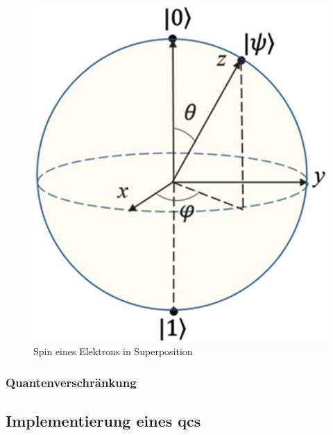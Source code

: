 \begin{figure}[!hbt]
    \centering
    \includegraphics{./images/spin-superpostition.jpg}
    \caption{Spin eines Elektrons in Superposition \cite{noauthor_cpb_27_9_090308_f8jpg_nodate}}
    \label{fig:spin}
\end{figure}

\subsubsection{Quantenverschränkung}



\subsection{Implementierung eines \ac{qc}s}


